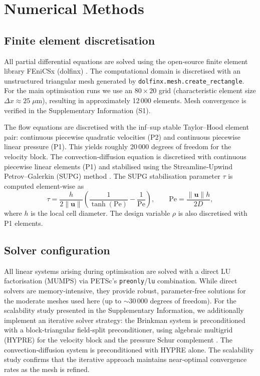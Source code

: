 \documentclass[12pt]{article}
\begin{document}
\section{Numerical Methods}
\label{sec:methods}

\subsection{Finite element discretisation}
All partial differential equations are solved using the open‑source finite element library FEniCSx (dolfinx) \cite{scroggs2022}. The computational domain is discretised with an unstructured triangular mesh generated by \texttt{dolfinx.mesh.create\_rectangle}. For the main optimisation runs we use an $80\times20$ grid (characteristic element size $\Delta x \approx 25\;\mu\text{m}$), resulting in approximately 12\,000 elements. Mesh convergence is verified in the Supplementary Information (S1).

The flow equations are discretised with the inf–sup stable Taylor–Hood element pair: continuous piecewise quadratic velocities (P2) and continuous piecewise linear pressure (P1). This yields roughly 20\,000 degrees of freedom for the velocity block. The convection‑diffusion equation is discretised with continuous piecewise linear elements (P1) and stabilised using the Streamline‑Upwind Petrov–Galerkin (SUPG) method \cite{brooks1982}. The SUPG stabilisation parameter $\tau$ is computed element‑wise as
\begin{equation}
\tau = \frac{h}{2\|\mathbf{u}\|} \left( \frac{1}{\tanh(\mathrm{Pe})} - \frac{1}{\mathrm{Pe}} \right), \qquad 
\mathrm{Pe} = \frac{\|\mathbf{u}\| h}{2 D},
\end{equation}
where $h$ is the local cell diameter. The design variable $\rho$ is also discretised with P1 elements.

\subsection{Solver configuration}
All linear systems arising during optimisation are solved with a direct LU factorisation (MUMPS) via PETSc’s \texttt{preonly}/\texttt{lu} combination. While direct solvers are memory‑intensive, they provide robust, parameter‑free solutions for the moderate meshes used here (up to $\sim 30\,000$ degrees of freedom). For the scalability study presented in the Supplementary Information, we additionally implement an iterative solver strategy: the Brinkman system is preconditioned with a block‑triangular field‑split preconditioner, using algebraic multigrid (HYPRE) for the velocity block and the pressure Schur complement \cite{elman2014}. The convection‑diffusion system is preconditioned with HYPRE alone. The scalability study confirms that the iterative approach maintains near‑optimal convergence rates as the mesh is refined.
\end{document}
